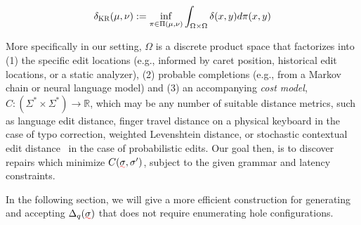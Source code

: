 \documentclass[sigplan,review,anonymous,acmsmall]{acmart}\settopmatter{printfolios=false,printccs=false,printacmref=false}
\begin{document}
\begin{align}
    \delta_{\textsc{KR}}(\mu, \nu) := \inf_{\pi\in \Pi(\mu, \nu)}\int_{\Omega\times \Omega} \delta(x, y)d\pi(x, y)
\end{align}

More specifically in our setting, $\Omega$ is a discrete product space that factorizes into (1) the specific edit locations (e.g., informed by caret position, historical edit locations, or a static analyzer), (2) probable completions (e.g., from a Markov chain or neural language model) and (3) an accompanying \textit{cost model}, $C: (\Sigma^* \times \Sigma^*) \rightarrow \mathbb{R}$, which may be any number of suitable distance metrics, such as language edit distance, finger travel distance on a physical keyboard in the case of typo correction, weighted Levenshtein distance, or stochastic contextual edit distance~\cite{cotterell+al.acl14} in the case of probabilistic edits. Our goal then, is to discover repairs which minimize $C(\err{\sigma}, \sigma')$, subject to the given grammar and latency constraints.

In the following section, we will give a more efficient construction for generating and accepting $\Delta_{q}(\err{\sigma})$ that does not require enumerating hole configurations.%

%
%
\end{document}
